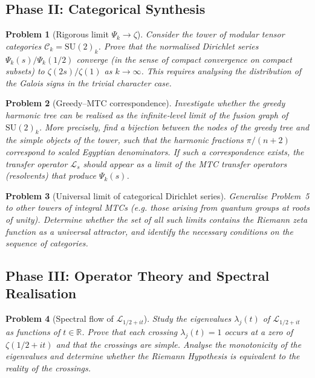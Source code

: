 \documentclass[11pt,a4paper]{article}
\newtheorem{problem}{Problem}[section]
\begin{document}
\subsection*{Phase II: Categorical Synthesis}

\begin{problem}[Rigorous limit \(\Psi_k \to \zeta\)]
Consider the tower of modular tensor categories \(\mathcal{C}_k = \mathrm{SU}(2)_k\). Prove that the normalised Dirichlet series \(\Psi_k(s)/\Psi_k(1/2)\) converge (in the sense of compact convergence on compact subsets) to \(\zeta(2s)/\zeta(1)\) as \(k\to\infty\). This requires analysing the distribution of the Galois signs in the trivial character case.
\end{problem}

\begin{problem}[Greedy–MTC correspondence]
Investigate whether the greedy harmonic tree can be realised as the infinite‑level limit of the fusion graph of \(\mathrm{SU}(2)_k\). More precisely, find a bijection between the nodes of the greedy tree and the simple objects of the tower, such that the harmonic fractions \(\pi/(n+2)\) correspond to scaled Egyptian denominators. If such a correspondence exists, the transfer operator \(\mathcal{L}_s\) should appear as a limit of the MTC transfer operators (resolvents) that produce \(\Psi_k(s)\).
\end{problem}

\begin{problem}[Universal limit of categorical Dirichlet series]
Generalise Problem~5 to other towers of integral MTCs (e.g. those arising from quantum groups at roots of unity). Determine whether the set of all such limits contains the Riemann zeta function as a universal attractor, and identify the necessary conditions on the sequence of categories.
\end{problem}

\subsection*{Phase III: Operator Theory and Spectral Realisation}

\begin{problem}[Spectral flow of \(\mathcal{L}_{1/2+it}\)]
Study the eigenvalues \(\lambda_j(t)\) of \(\mathcal{L}_{1/2+it}\) as functions of \(t\in\mathbb{R}\). Prove that each crossing \(\lambda_j(t)=1\) occurs at a zero of \(\zeta(1/2+it)\) and that the crossings are simple. Analyse the monotonicity of the eigenvalues and determine whether the Riemann Hypothesis is equivalent to the reality of the crossings.
\end{problem}
\end{document}

